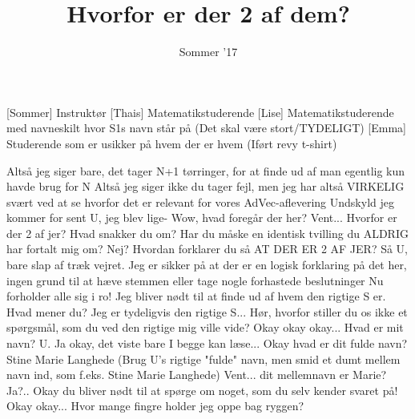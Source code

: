 \documentclass[a4paper,11pt]{article}
\title{Hvorfor er der 2 af dem?}
\author{Sommer '17}
\begin{document}
\maketitle

\begin{roles}
[Sommer] Instruktør
[Thais] Matematikstuderende 
[Lise] Matematikstuderende med navneskilt hvor S1s navn står på (Det skal være stort/TYDELIGT)
[Emma] Studerende som er usikker på hvem der er hvem (Iført revy t-shirt)
\end{roles}
\begin{sketch}
 Altså jeg siger bare, det tager N+1 tørringer, for at finde ud af man egentlig kun havde brug for N
 Altså jeg siger ikke du tager fejl, men jeg har altså VIRKELIG svært ved at se hvorfor det er relevant for vores AdVec-aflevering
 Undskyld jeg kommer for sent U, jeg blev lige- 
 Wow, hvad foregår der her?
  Vent... Hvorfor er der 2 af jer?
 Hvad snakker du om?
 Har du måske en identisk tvilling du ALDRIG har fortalt mig om?
 Nej?
 Hvordan forklarer du så  AT DER ER 2 AF JER?
 Så U, bare slap af træk vejret. Jeg er sikker på at der er en logisk forklaring på det her, ingen grund til at hæve stemmen eller tage nogle forhastede beslutninger
 Nu forholder alle sig i ro! Jeg bliver nødt til at finde ud af hvem den rigtige S er.
 Hvad mener du? Jeg er tydeligvis den rigtige S... Hør, hvorfor stiller du os ikke et spørgsmål, som du ved den rigtige mig ville vide?
 Okay okay okay... Hvad er mit navn?
 U. 
 Ja okay, det viste bare I begge kan læse... Okay hvad er dit fulde navn?
 Stine Marie Langhede (Brug U's rigtige "fulde" navn, men smid et dumt mellem navn ind, som f.eks. Stine Marie Langhede)
 Vent... dit mellemnavn er Marie?
  Ja?.. 
 Okay du bliver nødt til at spørge om noget, som du selv kender svaret på!
Okay okay...  Hvor mange fingre holder jeg oppe bag ryggen?

\end{sketch}
\end{document}
